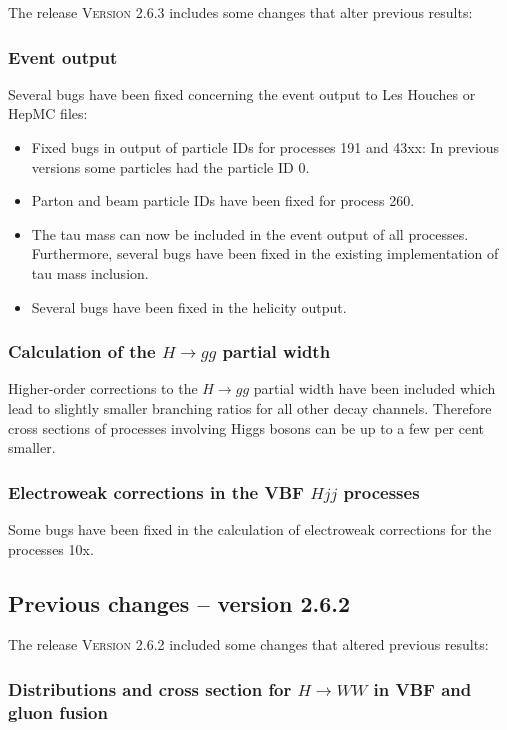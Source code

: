 \documentclass[english,12pt]{article}
\begin{document}
The release \textsc{Version 2.6.3} includes some changes that alter previous results:

\subsubsection{Event output}

Several bugs have been fixed concerning the event output to Les Houches or HepMC files:
\begin{itemize}
 \item Fixed bugs in output of particle IDs for processes 191 and 43xx: In previous versions
       some particles had the particle ID 0.
 \item Parton and beam particle IDs have been fixed for process 260.
 \item The tau mass can now be included in the event output of all processes. Furthermore,
       several bugs have been fixed in the existing implementation of tau mass inclusion.
 \item Several bugs have been fixed in the helicity output.
\end{itemize}

\subsubsection{Calculation of the $H\to gg$ partial width}

Higher-order corrections to the $H\to gg$ partial width have been included which lead to slightly smaller
branching ratios for all other decay channels. Therefore cross sections of processes involving Higgs bosons
can be up to a few per cent smaller.

\subsubsection{Electroweak corrections in the VBF $Hjj$ processes}

Some bugs have been fixed in the calculation of electroweak corrections for the processes 10x.



\subsection{Previous changes -- version 2.6.2}

The release \textsc{Version 2.6.2} included some changes that altered previous results:

\subsubsection{Distributions and cross section for $H\to WW$ in VBF and gluon fusion}
\end{document}
